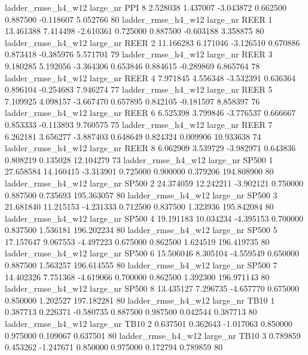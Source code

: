  ladder_rmse_h4_w12   large_nr      PPI                 8  2.528038  1.437007  -3.043872 0.662500 0.887500 -0.118607    5.052766 80
 ladder_rmse_h4_w12   large_nr     REER                 1 13.461388  7.414498  -2.610361 0.725000 0.887500 -0.603188    3.358875 80
 ladder_rmse_h4_w12   large_nr     REER                 2 11.166283  6.171046  -3.126510 0.670886 0.873418 -0.385976    5.571701 79
 ladder_rmse_h4_w12   large_nr     REER                 3  9.180285  5.192056  -3.364306 0.653846 0.884615 -0.289869    6.865764 78
 ladder_rmse_h4_w12   large_nr     REER                 4  7.971845  4.556348  -3.532391 0.636364 0.896104 -0.254683    7.946274 77
 ladder_rmse_h4_w12   large_nr     REER                 5  7.109925  4.098157  -3.667470 0.657895 0.842105 -0.181597    8.858397 76
 ladder_rmse_h4_w12   large_nr     REER                 6  6.525398  3.799846  -3.776537 0.666667 0.853333 -0.113893    9.760575 75
 ladder_rmse_h4_w12   large_nr     REER                 7  6.262181  3.656277  -3.887403 0.648649 0.824324  0.009906   10.933638 74
 ladder_rmse_h4_w12   large_nr     REER                 8  6.062909  3.539729  -3.982971 0.643836 0.808219  0.135028   12.104279 73
 ladder_rmse_h4_w12   large_nr    SP500                 1 27.658584 14.160415  -3.313901 0.725000 0.900000  0.379206  194.808900 80
 ladder_rmse_h4_w12   large_nr    SP500                 2 24.374059 12.242211  -3.902121 0.750000 0.887500  0.735693  195.363057 80
 ladder_rmse_h4_w12   large_nr    SP500                 3 21.681840 11.215153  -4.231333 0.712500 0.837500  1.323936  195.842084 80
 ladder_rmse_h4_w12   large_nr    SP500                 4 19.191183 10.034234  -4.395153 0.700000 0.837500  1.536181  196.202234 80
 ladder_rmse_h4_w12   large_nr    SP500                 5 17.157647  9.067553  -4.497223 0.675000 0.862500  1.624519  196.419735 80
 ladder_rmse_h4_w12   large_nr    SP500                 6 15.506046  8.305104  -4.559549 0.650000 0.887500  1.563257  196.614555 80
 ladder_rmse_h4_w12   large_nr    SP500                 7 14.402326  7.751368  -4.619066 0.700000 0.862500  1.392300  196.971143 80
 ladder_rmse_h4_w12   large_nr    SP500                 8 13.435127  7.296735  -4.657770 0.675000 0.850000  1.202527  197.182281 80
 ladder_rmse_h4_w12   large_nr     TB10                 1  0.387713  0.226371  -0.580735 0.887500 0.987500  0.042544    0.387713 80
 ladder_rmse_h4_w12   large_nr     TB10                 2  0.637501  0.362643  -1.017063 0.850000 0.975000  0.109067    0.637501 80
 ladder_rmse_h4_w12   large_nr     TB10                 3  0.789859  0.453262  -1.247671 0.850000 0.975000  0.172794    0.789859 80
